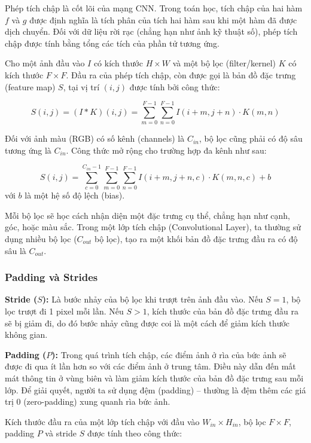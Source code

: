 \documentclass[12pt,a4paper]{article}
\begin{document}
Phép tích chập là cốt lõi của mạng CNN. Trong toán học, tích chập của hai hàm $f$ và $g$ được định nghĩa là tích phân của tích hai hàm sau khi một hàm đã được dịch chuyển. Đối với dữ liệu rời rạc (chẳng hạn như ảnh kỹ thuật số), phép tích chập được tính bằng tổng các tích của phần tử tương ứng.

Cho một ảnh đầu vào $I$ có kích thước $H \times W$ và một bộ lọc (filter/kernel) $K$ có kích thước $F \times F$. Đầu ra của phép tích chập, còn được gọi là bản đồ đặc trưng (feature map) $S$, tại vị trí $(i, j)$ được tính bởi công thức:

\begin{equation}
    S(i, j) = (I * K)(i, j) = \sum_{m=0}^{F-1} \sum_{n=0}^{F-1} I(i + m, j + n) \cdot K(m, n)
\end{equation}

Đối với ảnh màu (RGB) có số kênh (channels) là $C_{in}$, bộ lọc cũng phải có độ sâu tương ứng là $C_{in}$. Công thức mở rộng cho trường hợp đa kênh như sau:

\begin{equation}
    S(i, j) = \sum_{c=0}^{C_{in}-1} \sum_{m=0}^{F-1} \sum_{n=0}^{F-1} I(i+m, j+n, c) \cdot K(m, n, c) + b
\end{equation}
với $b$ là một hệ số độ lệch (bias).

Mỗi bộ lọc sẽ học cách nhận diện một đặc trưng cụ thể, chẳng hạn như cạnh, góc, hoặc màu sắc. Trong một lớp tích chập (Convolutional Layer), ta thường sử dụng nhiều bộ lọc ($C_{out}$ bộ lọc), tạo ra một khối bản đồ đặc trưng đầu ra có độ sâu là $C_{out}$.

\subsubsection{Padding và Strides}

\textbf{Stride ($S$):} Là bước nhảy của bộ lọc khi trượt trên ảnh đầu vào. Nếu $S=1$, bộ lọc trượt đi 1 pixel mỗi lần. Nếu $S>1$, kích thước của bản đồ đặc trưng đầu ra sẽ bị giảm đi, do đó bước nhảy cũng được coi là một cách để giảm kích thước không gian.

\textbf{Padding ($P$):} Trong quá trình tích chập, các điểm ảnh ở rìa của bức ảnh sẽ được đi qua ít lần hơn so với các điểm ảnh ở trung tâm. Điều này dẫn đến mất mát thông tin ở vùng biên và làm giảm kích thước của bản đồ đặc trưng sau mỗi lớp. Để giải quyết, người ta sử dụng đệm (padding) – thường là đệm thêm các giá trị $0$ (zero-padding) xung quanh rìa bức ảnh.

Kích thước đầu ra của một lớp tích chập với đầu vào $W_{in} \times H_{in}$, bộ lọc $F \times F$, padding $P$ và stride $S$ được tính theo công thức:
\end{document}
